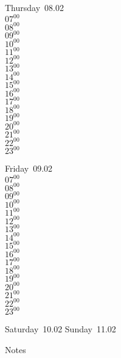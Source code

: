 \documentclass[11pt, a4paper]{book}\usepackage[]{graphicx}\usepackage[]{color}
\begin{document}
\begin{weekdaybox}
  Thursday~08.02\\
  { 
  \vfill
  $07^{00}$\\
$08^{00}$\\
$09^{00}$\\
$10^{00}$\\
$11^{00}$\\
$12^{00}$\\
$13^{00}$\\
$14^{00}$\\
$15^{00}$\\
$16^{00}$\\
$17^{00}$\\
$18^{00}$\\
$19^{00}$\\
$20^{00}$\\
$21^{00}$\\
$22^{00}$\\
$23^{00}$\\
  }
\end{weekdaybox} 
\begin{weekdaybox}
  Friday~09.02\\
  { 
  \vfill
  $07^{00}$\\
$08^{00}$\\
$09^{00}$\\
$10^{00}$\\
$11^{00}$\\
$12^{00}$\\
$13^{00}$\\
$14^{00}$\\
$15^{00}$\\
$16^{00}$\\
$17^{00}$\\
$18^{00}$\\
$19^{00}$\\
$20^{00}$\\
$21^{00}$\\
$22^{00}$\\
$23^{00}$\\
  }
\end{weekdaybox}
\begin{weekendbox}
  Saturday~10.02
  \tcblower
  Sunday~11.02
\end{weekendbox} %
\begin{notebox}
  Notes
\end{notebox}
\clearpage
\end{document}

